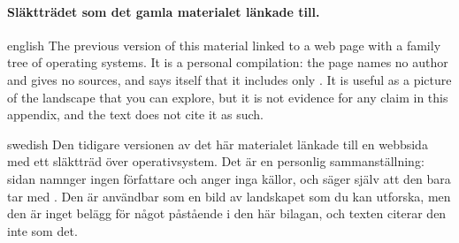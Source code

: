 \paragraph{%
  {Släktträdet som det gamla materialet länkade till.}} %
\begin{onlyin}{english} %
The previous version of this material linked to a web page with a family
tree of operating systems\autocite{Eylenburg2026FamilyTree}.
It is a personal compilation: the page names no author and gives no
sources, and says itself that it includes only
.
It is useful as a picture of the landscape that you can explore, but it
is not evidence for any claim in this appendix, and the text does not
cite it as such.
\end{onlyin}
\begin{onlyin}{swedish}
Den tidigare versionen av det här materialet länkade till en webbsida
med ett släktträd över operativsystem\autocite{Eylenburg2026FamilyTree}.
Det är en personlig sammanställning: sidan namnger ingen författare och
anger inga källor, och säger själv att den bara tar med
.
Den är användbar som en bild av landskapet som du kan utforska, men den
är inget belägg för något påstående i den här bilagan, och texten
citerar den inte som det.
\end{onlyin}

\section{} %

